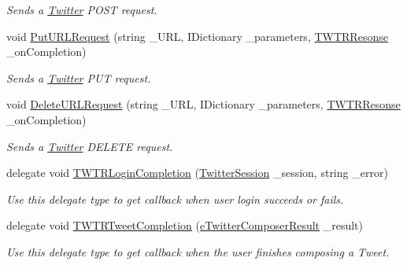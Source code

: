 \begin{DoxyCompactItemize}
\begin{DoxyCompactList}\small\item\em Sends a \hyperlink{class_voxel_busters_1_1_native_plugins_1_1_twitter}{Twitter} P\+O\+S\+T request. \end{DoxyCompactList}\item 
void \hyperlink{class_voxel_busters_1_1_native_plugins_1_1_twitter_afe9cc3d9c200534cfec99ffd6e521798}{Put\+U\+R\+L\+Request} (string \+\_\+\+U\+R\+L, I\+Dictionary \+\_\+parameters, \hyperlink{class_voxel_busters_1_1_native_plugins_1_1_twitter_a75983752eed2d648d967943ca91eb9aa}{T\+W\+T\+R\+Resonse} \+\_\+on\+Completion)
\begin{DoxyCompactList}\small\item\em Sends a \hyperlink{class_voxel_busters_1_1_native_plugins_1_1_twitter}{Twitter} P\+U\+T request. \end{DoxyCompactList}\item 
void \hyperlink{class_voxel_busters_1_1_native_plugins_1_1_twitter_a60a173d7e40567cf4c848f458f63e23d}{Delete\+U\+R\+L\+Request} (string \+\_\+\+U\+R\+L, I\+Dictionary \+\_\+parameters, \hyperlink{class_voxel_busters_1_1_native_plugins_1_1_twitter_a75983752eed2d648d967943ca91eb9aa}{T\+W\+T\+R\+Resonse} \+\_\+on\+Completion)
\begin{DoxyCompactList}\small\item\em Sends a \hyperlink{class_voxel_busters_1_1_native_plugins_1_1_twitter}{Twitter} D\+E\+L\+E\+T\+E request. \end{DoxyCompactList}\item 
delegate void \hyperlink{class_voxel_busters_1_1_native_plugins_1_1_twitter_a34f959f59508d1442e3d921bbfe45cd5}{T\+W\+T\+R\+Login\+Completion} (\hyperlink{class_voxel_busters_1_1_native_plugins_1_1_twitter_session}{Twitter\+Session} \+\_\+session, string \+\_\+error)
\begin{DoxyCompactList}\small\item\em Use this delegate type to get callback when user login succeeds or fails. \end{DoxyCompactList}\item 
delegate void \hyperlink{class_voxel_busters_1_1_native_plugins_1_1_twitter_afc6b9ce57f190495125926ab9a0a2986}{T\+W\+T\+R\+Tweet\+Completion} (\hyperlink{namespace_voxel_busters_1_1_native_plugins_a6b27d398d97a7d2de511f9aa2244fcc0}{e\+Twitter\+Composer\+Result} \+\_\+result)
\begin{DoxyCompactList}\small\item\em Use this delegate type to get callback when the user finishes composing a Tweet. \end{DoxyCompactList}\item 

\end{DoxyCompactItemize}
